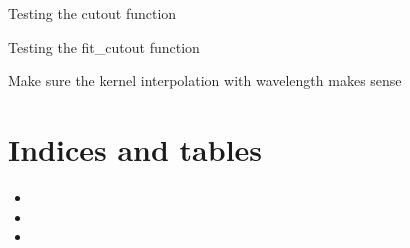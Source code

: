 \documentclass[letterpaper,10pt,english]{sphinxmanual}
\begin{document}

\begin{fulllineitems}
\label{unitTests:unitTests.testCutout}
Testing the cutout function

\end{fulllineitems}


\begin{fulllineitems}
\label{unitTests:unitTests.testFitCutout}
Testing the fit\_cutout function

\end{fulllineitems}


\begin{fulllineitems}
\label{unitTests:unitTests.testGenPixSol}
\end{fulllineitems}


\begin{fulllineitems}
\label{unitTests:unitTests.testLoadKernels}
Make sure the kernel interpolation with wavelength makes sense

\end{fulllineitems}



\part{Indices and tables}
\label{index:indices-and-tables}\label{index:astropy}\begin{itemize}
\item {} 

\item {} 

\item {} 

\end{itemize}
\end{document}
